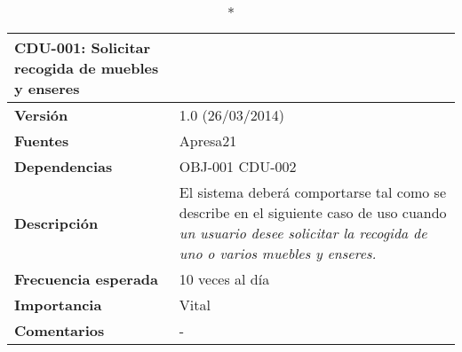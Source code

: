 \begin{longtable}{p{2.5cm}  p{14cm}}
\caption*{\textbf{CDU-001: Solicitar recogida de muebles y enseres}} \\
\hline
\textbf{Versión} & 1.0 (26/03/2014) \\
\textbf{Fuentes} & Apresa21 \\
\textbf{Dependencias} & OBJ-001 CDU-002 \\
\textbf{Descripción} & El sistema deberá comportarse tal como se describe en el siguiente caso de uso cuando \textit{un usuario desee solicitar la recogida de uno o varios muebles y enseres.} \\
\textbf{Frecuencia esperada} & 10 veces al día \\
\textbf{Importancia} & Vital  \\
\textbf{Comentarios} &- \\
\end{longtable}

